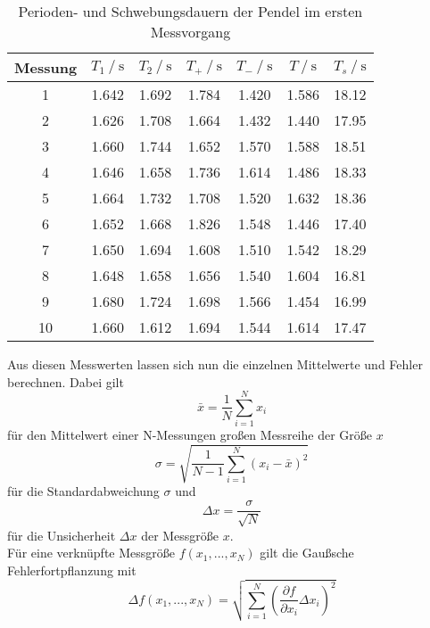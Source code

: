 \begin{table}
  \centering
  \caption{Perioden- und Schwebungsdauern der Pendel im ersten Messvorgang}
  \label{tab:Messvorgang 2}
  \begin{tabular}{S[table-format=2.0] S S S S S S[table-format=2.2]}
      \toprule
      {Messung} & {$T_1 \mathbin{/} \unit{\second}$} & {$T_2 \mathbin{/} \unit{\second}$} 
      & {$T_+ \mathbin{/} \unit{\second}$} & {$T_- \mathbin{/} \unit{\second}$} & {$T \mathbin{/} \unit{\second}$} & {$T_s \mathbin{/} \unit{\second}$} \\
       & 1.642 & 1.692 & 1.784 & 1.420 & 1.586 & 18.12 \\  
       2 & 1.626 & 1.708 & 1.664 & 1.432 & 1.440 & 17.95 \\ 
       3 & 1.660 & 1.744 & 1.652 & 1.570 & 1.588 & 18.51 \\ 
       4 & 1.646 & 1.658 & 1.736 & 1.614 & 1.486 & 18.33 \\ 
       5 & 1.664 & 1.732 & 1.708 & 1.520 & 1.632 & 18.36 \\ 
       6 & 1.652 & 1.668 & 1.826 & 1.548 & 1.446 & 17.40 \\ 
       7 & 1.650 & 1.694 & 1.608 & 1.510 & 1.542 & 18.29 \\ 
       8 & 1.648 & 1.658 & 1.656 & 1.540 & 1.604 & 16.81 \\ 
       9 & 1.680 & 1.724 & 1.698 & 1.566 & 1.454 & 16.99 \\ 
      10 & 1.660 & 1.612 & 1.694 & 1.544 & 1.614 & 17.47 \\ 
      \bottomrule
  \end{tabular}
\end{table}

Aus diesen Messwerten lassen sich nun die einzelnen Mittelwerte und Fehler berechnen. Dabei gilt
\begin{equation}
  \bar{x}=\dfrac{1}{N}\sum_{i=1}^N x_i
\end{equation}
für den Mittelwert einer N-Messungen großen Messreihe der Größe $x$
\begin{equation}
σ=\sqrt{\dfrac{1}{N-1}\sum_{i=1}^N(x_i-\bar{x})^2}  
\end{equation}
für die Standardabweichung $σ$ und
\begin{equation}
  Δx=\dfrac{σ}{\sqrt{N}} 
\end{equation}
für die Unsicherheit $Δx$ der Messgröße $x$. \\

Für eine verknüpfte Messgröße $f(x_1,...,x_N)$ gilt die Gaußsche Fehlerfortpflanzung mit
\begin{equation}
Δf(x_1,...,x_N)=\sqrt{\sum_{i=1}^N (\frac{\partial f}{\partial x_i}Δx_i)^2}
\label{eq:gaussF}
\end{equation}


